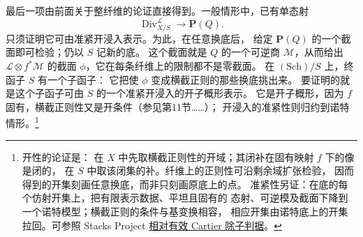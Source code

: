 \documentclass[openany,fontset=fandol]{ctexbook}
\newcommand{\LL}{\mathcal L}
\newcommand{\MM}{\mathcal M}
\newcommand{\Div}{\operatorname{Div}}
\newcommand{\PP}{\mathbf P}
\begin{document}
最后一项由前面关于整纤维的论证直接得到。一般情形中，已有单态射
\[
 \Div^{\LL}_{X/S}\longrightarrow\PP(Q).
\]
只须证明它可由准紧开浸入表示。为此，在任意换底后，
给定 \(\PP(Q)\) 的一个截面即可检验；仍以 \(S\) 记新的底。
这个截面就是 \(Q\) 的一个可逆商 \(\MM\)，从而给出
\(\LL\otimes f^*\MM\) 的截面 \(\phi\)，它在每条纤维上的限制都不是零截面。
在 \((\mathrm{Sch})/S\) 上，终函子 \(S\) 有一个子函子：
它把使 \(\phi\) 变成横截正则的那些换底挑出来。
要证明的就是这个子函子可由 \(S\) 的一个准紧开浸入的开子概形表示。
它是开子概形，因为 \(f\) 固有，横截正则性又是开条件（参见第11节……）；
开浸入的准紧性则归约到诺特情形。\footnote{开性的论证是：
在 \(X\) 中先取横截正则性的开域；其闭补在固有映射 \(f\) 下的像是闭的，
在 \(S\) 中取该闭集的补。纤维上的正则性可沿剩余域扩张检验，
因而得到的开集刻画任意换底，而非只刻画原底上的点。
准紧性另证：在底的每个仿射开集上，把有限表示数据、平坦且固有的
态射、可逆模及截面下降到一个诺特模型；横截正则的条件与基变换相容，
相应开集由诺特底上的开集拉回。可参照 Stacks Project
\href{https://stacks.math.columbia.edu/tag/062Y}{相对有效 Cartier 除子判据}。}
\end{document}
